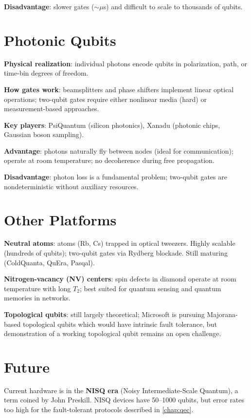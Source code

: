 \documentclass[oneside]{academica}
\begin{document}
\textbf{Disadvantage}: slower gates ($\sim\mu$s) and difficult to scale to thousands of qubits.

\section{Photonic Qubits}

\textbf{Physical realization}: individual photons encode qubits in polarization, path, or time-bin degrees of freedom.

\textbf{How gates work}: beamsplitters and phase shifters implement linear optical operations; two-qubit gates require either nonlinear media (hard) or measurement-based approaches.

\textbf{Key players}: PsiQuantum (silicon photonics), Xanadu (photonic chips, Gaussian boson sampling).

\textbf{Advantage}: photons naturally fly between nodes (ideal for communication); operate at room temperature; no decoherence during free propagation.

\textbf{Disadvantage}: photon loss is a fundamental problem; two-qubit gates are nondeterministic without auxiliary resources.

\section{Other Platforms}

\textbf{Neutral atoms}: atoms (Rb, Cs) trapped in optical tweezers.
Highly scalable (hundreds of qubits); two-qubit gates via Rydberg blockade.
Still maturing (ColdQuanta, QuEra, Pasqal).

\textbf{Nitrogen-vacancy (NV) centers}: spin defects in diamond operate at room temperature with long $T_2$; best suited for quantum sensing and quantum memories in networks.

\textbf{Topological qubits}: still largely theoretical; Microsoft is pursuing Majorana-based topological qubits which would have intrinsic fault tolerance, but demonstration of a working topological qubit remains an open challenge.

\section{Future}

Current hardware is in the \textbf{NISQ era} (Noisy Intermediate-Scale Quantum), a term coined by John Preskill.
NISQ devices have 50--1000 qubits, but error rates too high for the fault-tolerant protocols described in \autoref{chap:qec}.
\end{document}

